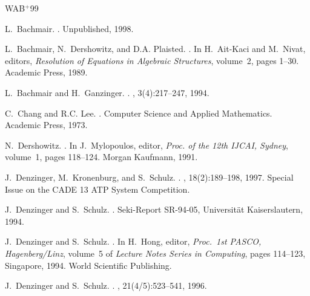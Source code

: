 \documentclass{report}
\begin{document}
%
\newcommand{\etalchar}[1]{$^{#1}$}
\begin{thebibliography}{WAB{\etalchar{+}}99}

L.~Bachmair.
.
\newblock Unpublished, 1998.

L.~Bachmair, N.~Dershowitz, and D.A. Plaisted.
.
\newblock In H.~Ait-Kaci and M.~Nivat, editors, {\em Resolution of Equations in
  Algebraic Structures}, volume~2, pages 1--30. Academic Press, 1989.

L.~Bachmair and H.~Ganzinger.
.
, 3(4):217--247, 1994.

C.~Chang and R.C. Lee.
.
\newblock Computer Science and Applied Mathematics. Academic Press, 1973.

N.~Dershowitz.
.
\newblock In J.~Mylopoulos, editor, {\em Proc. of the 12th IJCAI, Sydney},
  volume~1, pages 118--124. Morgan Kaufmann, 1991.

J.~Denzinger, M.~Kronenburg, and S.~Schulz.
.
, 18(2):189--198, 1997.
\newblock Special Issue on the CADE 13 ATP System Competition.

J.~Denzinger and S.~Schulz.
.
\newblock Seki-Report SR-94-05, Universit{\"a}t Kai\-sers\-lau\-tern, 1994.

J.~Denzinger and S.~Schulz.
.
\newblock In H.~Hong, editor, {\em Proc.\ 1st PASCO, Hagenberg/Linz}, volume~5
  of {\em Lecture Notes Series in Computing}, pages 114--123, Singapore, 1994.
  World Scientific Publishing.

J.~Denzinger and S.~Schulz.
.
, 21(4/5):523--541, 1996.


\end{thebibliography}
\end{document}
